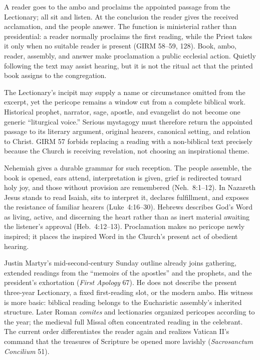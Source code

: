 A reader goes to the ambo and proclaims the appointed passage from the Lectionary; all sit and listen. At the conclusion the reader gives the received acclamation, and the people answer. The function is ministerial rather than presidential: a reader normally proclaims the first reading, while the Priest takes it only when no suitable reader is present (GIRM 58--59, 128). Book, ambo, reader, assembly, and answer make proclamation a public ecclesial action. Quietly following the text may assist hearing, but it is not the ritual act that the printed book assigns to the congregation.

The Lectionary's incipit may supply a name or circumstance omitted from the excerpt, yet the pericope remains a window cut from a complete biblical work. Historical prophet, narrator, sage, apostle, and evangelist do not become one generic ``liturgical voice.'' Serious mystagogy must therefore return the appointed passage to its literary argument, original hearers, canonical setting, and relation to Christ. GIRM 57 forbids replacing a reading with a non-biblical text precisely because the Church is receiving revelation, not choosing an inspirational theme.

Nehemiah gives a durable grammar for such reception. The people assemble, the book is opened, ears attend, interpretation is given, grief is redirected toward holy joy, and those without provision are remembered (Neh.~8:1--12). In Nazareth Jesus stands to read Isaiah, sits to interpret it, declares fulfillment, and exposes the resistance of familiar hearers (Luke~4:16--30). Hebrews describes God's Word as living, active, and discerning the heart rather than as inert material awaiting the listener's approval (Heb.~4:12--13). Proclamation makes no pericope newly inspired; it places the inspired Word in the Church's present act of obedient hearing.

Justin Martyr's mid-second-century Sunday outline already joins gathering, extended readings from the ``memoirs of the apostles'' and the prophets, and the president's exhortation (\emph{First Apology} 67). He does not describe the present three-year Lectionary, a fixed first-reading slot, or the modern ambo. His witness is more basic: biblical reading belongs to the Eucharistic assembly's inherited structure. Later Roman \emph{comites} and lectionaries organized pericopes according to the year; the medieval full Missal often concentrated reading in the celebrant. The current order differentiates the reader again and realizes Vatican II's command that the treasures of Scripture be opened more lavishly (\emph{Sacrosanctum Concilium} 51).

